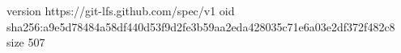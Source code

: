 version https://git-lfs.github.com/spec/v1
oid sha256:a9e5d78484a58df440d53f9d2fe3b59aa2eda428035c71e6a03e2df372f482c8
size 507
